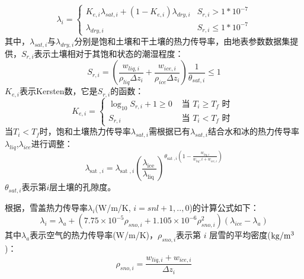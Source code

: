\begin{equation}
\lambda_{i}=\left\{\begin{array}{ll}K_{e, i} \lambda_{sat, i}+\left(1-K_{e, i}\right) \lambda_{d r y, i} & S_{r, i}>1 * 10^{-7} \\ \lambda_{d r y, i} & S_{r, i} \leq 1 * 10^{-7}\end{array}\right.
\end{equation}
其中，$\lambda_{sat,i}$与$\lambda_{dry,i}$分别是饱和土壤和干土壤的热力传导率，由地表参数数据集提供，$S_{r,i}$表示土壤相对于其饱和状态的潮湿程度：
\begin{equation}
S_{r, i}=\left(\frac{w_{liq, i}}{\rho_{liq} \Delta z_{i}}+\frac{w_{ice, i}}{\rho_{ice} \Delta z_{i}}\right) \frac{1}{\theta_{sat, i}} \leq 1
\end{equation}
$K_{e,i}$表示Kersten数，它是$S_{r,i}$的函数：
\begin{equation}
K_{e, i}=\left\{\begin{array}{ll}\log _{10} S_{r, i}+1 \geq 0 & \text { 当 } T_{i} \geq T_{f} \text { 时 } \\ S_{r, i} & \text { 当 } T_{i}<T_{f} \text { 时 }\end{array}\right.
\end{equation}
当$T_i<T_f$时，饱和土壤热力传导率$\lambda_{sat,i}$需根据已有$\lambda_{sat,i}$结合水和冰的热力传导率$\lambda_{liq}$,$\lambda_{ice}$进行调整：
\begin{equation}
\lambda_{\text {sat }, i}=\lambda_{\text {sat }, i}\left(\frac{\lambda_{\text {ice }}}{\lambda_{\text {liq }}}\right)^{\theta_{\text {sat }, i}\left(1-\frac{w_{liq, i}}{w_{liq}, i+w_{ice, i}}\right)}
\end{equation}
$\theta_{sat,i}$表示第$ i $层土壤的孔隙度。


根据\citet{jordan1991one}，雪盖热力传导率$\lambda_i$(W/m/K, $i=snl+1,..,0$)的计算公式如下：
\begin{equation}
\lambda_{i}=\lambda_{a}+\left(7.75 \times 10^{-5} \rho_{sno, i}+1.105 \times 10^{-6} \rho_{sno, i}^{2}\right)\left(\lambda_{ice}-\lambda_{a}\right)
\end{equation}
其中$\lambda_a$表示空气的热力传导率(W/m/K)，$\rho_{sno,i}$表示第 $i$ 层雪的平均密度($\rm kg/m^3$)：
\begin{equation}
\rho_{sno, i}=\frac{w_{liq, i}+w_{ice, i}}{\Delta z_{i}}
\end{equation}




